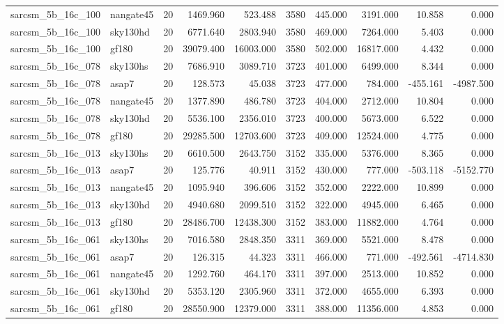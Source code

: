 \begin{tabular}{llrrrrrrrr}
sarcsm\_5b\_16c\_100 & nangate45 & 20 & 1469.960 & 523.488 & 3580 & 445.000 & 3191.000 & 10.858 & 0.000 \\
sarcsm\_5b\_16c\_100 & sky130hd & 20 & 6771.640 & 2803.940 & 3580 & 469.000 & 7264.000 & 5.403 & 0.000 \\
sarcsm\_5b\_16c\_100 & gf180 & 20 & 39079.400 & 16003.000 & 3580 & 502.000 & 16817.000 & 4.432 & 0.000 \\
sarcsm\_5b\_16c\_078 & sky130hs & 20 & 7686.910 & 3089.710 & 3723 & 401.000 & 6499.000 & 8.344 & 0.000 \\
sarcsm\_5b\_16c\_078 & asap7 & 20 & 128.573 & 45.038 & 3723 & 477.000 & 784.000 & -455.161 & -4987.500 \\
sarcsm\_5b\_16c\_078 & nangate45 & 20 & 1377.890 & 486.780 & 3723 & 404.000 & 2712.000 & 10.804 & 0.000 \\
sarcsm\_5b\_16c\_078 & sky130hd & 20 & 5536.100 & 2356.010 & 3723 & 400.000 & 5673.000 & 6.522 & 0.000 \\
sarcsm\_5b\_16c\_078 & gf180 & 20 & 29285.500 & 12703.600 & 3723 & 409.000 & 12524.000 & 4.775 & 0.000 \\
sarcsm\_5b\_16c\_013 & sky130hs & 20 & 6610.500 & 2643.750 & 3152 & 335.000 & 5376.000 & 8.365 & 0.000 \\
sarcsm\_5b\_16c\_013 & asap7 & 20 & 125.776 & 40.911 & 3152 & 430.000 & 777.000 & -503.118 & -5152.770 \\
sarcsm\_5b\_16c\_013 & nangate45 & 20 & 1095.940 & 396.606 & 3152 & 352.000 & 2222.000 & 10.899 & 0.000 \\
sarcsm\_5b\_16c\_013 & sky130hd & 20 & 4940.680 & 2099.510 & 3152 & 322.000 & 4945.000 & 6.465 & 0.000 \\
sarcsm\_5b\_16c\_013 & gf180 & 20 & 28486.700 & 12438.300 & 3152 & 383.000 & 11882.000 & 4.764 & 0.000 \\
sarcsm\_5b\_16c\_061 & sky130hs & 20 & 7016.580 & 2848.350 & 3311 & 369.000 & 5521.000 & 8.478 & 0.000 \\
sarcsm\_5b\_16c\_061 & asap7 & 20 & 126.315 & 44.323 & 3311 & 466.000 & 771.000 & -492.561 & -4714.830 \\
sarcsm\_5b\_16c\_061 & nangate45 & 20 & 1292.760 & 464.170 & 3311 & 397.000 & 2513.000 & 10.852 & 0.000 \\
sarcsm\_5b\_16c\_061 & sky130hd & 20 & 5353.120 & 2305.960 & 3311 & 372.000 & 4655.000 & 6.393 & 0.000 \\
sarcsm\_5b\_16c\_061 & gf180 & 20 & 28550.900 & 12379.000 & 3311 & 388.000 & 11356.000 & 4.853 & 0.000 \\

\end{tabular}
